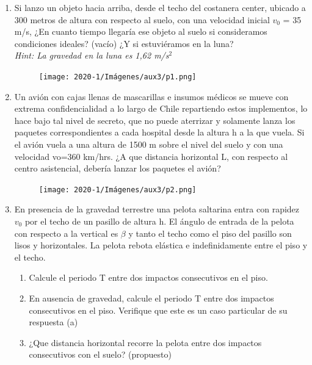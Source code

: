 \documentclass[letterpaper,11pt]{article}
\begin{document}
\begin{enumerate}
\item Si lanzo un objeto hacia arriba, desde el techo del costanera center, ubicado a 300 metros de altura con respecto al suelo, con una velocidad inicial $v_0$ = 35 m/s, ¿En cuanto tiempo llegaría ese objeto al suelo si consideramos condiciones ideales? (vacío) ¿Y si estuviéramos en la luna?\\
\textit{Hint: La gravedad en la luna es 1,62 m/s$^2$}

\begin{figure}[H]
        \centering
        \texttt{[image: 2020-1/Imágenes/aux3/p1.png]}
    \end{figure}


\item Un avión con cajas llenas de mascarillas e insumos médicos se mueve con extrema confidencialidad a lo largo de Chile repartiendo estos implementos, lo hace bajo tal nivel de secreto, que no puede aterrizar y solamente lanza los paquetes correspondientes a cada hospital desde la altura h a la que vuela. Si el avión vuela a una altura de 1500 m sobre el nivel del suelo y con una velocidad vo=360 km/hrs. ¿A que distancia horizontal L, con respecto al centro asistencial, debería lanzar los paquetes el avión?
    
   \begin{figure}[H]
        \centering
        \texttt{[image: 2020-1/Imágenes/aux3/p2.png]}
    \end{figure} 
    
\item  En presencia de la gravedad terrestre una pelota saltarina entra con rapidez $v_0$ por el techo de un pasillo de altura h. El ángulo de entrada de la pelota con respecto a la vertical es 
$\beta$ y tanto el techo como el piso del pasillo son lisos y horizontales. La pelota rebota elástica e indefinidamente entre el piso y el techo.

\begin{enumerate}
    \item Calcule el periodo T entre dos impactos consecutivos en el piso.
    
    \item En ausencia de gravedad, calcule el periodo T entre dos impactos consecutivos en el piso. Verifique que este es un caso particular de su respuesta (a)
    
    \item ¿Que distancia horizontal recorre la pelota entre dos impactos consecutivos con el suelo? (propuesto)
\end{enumerate}
    

\end{enumerate}
\end{document}
